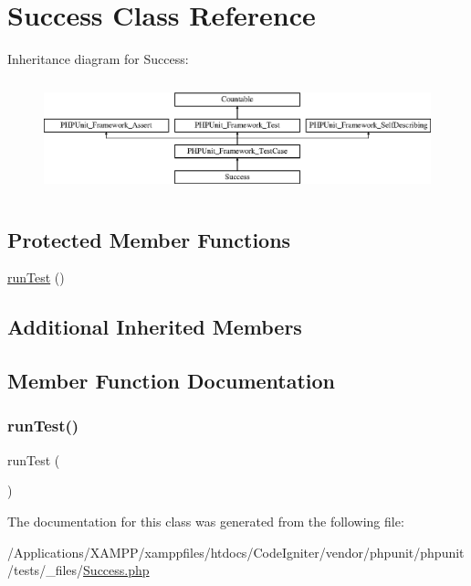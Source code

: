\hypertarget{class_success}{}\section{Success Class Reference}
\label{class_success}
Inheritance diagram for Success\+:\begin{figure}[H]
\begin{center}
\leavevmode
\includegraphics[height=3.303835cm]{class_success}
\end{center}
\end{figure}
\subsection*{Protected Member Functions}
\begin{DoxyCompactItemize}
\item 
\mbox{\hyperlink{class_success_ad2541a093be4d619db04ed65d661a684}{run\+Test}} ()
\end{DoxyCompactItemize}
\subsection*{Additional Inherited Members}


\subsection{Member Function Documentation}
\mbox{\label{class_success_ad2541a093be4d619db04ed65d661a684}} 
\subsubsection{\texorpdfstring{run\+Test()}{runTest()}}
{\footnotesize\ttfamily run\+Test (\begin{DoxyParamCaption}{ }\end{DoxyParamCaption})\hspace{0.3cm}{\ttfamily [protected]}}



The documentation for this class was generated from the following file\+:\begin{DoxyCompactItemize}
\item 
/\+Applications/\+X\+A\+M\+P\+P/xamppfiles/htdocs/\+Code\+Igniter/vendor/phpunit/phpunit/tests/\+\_\+files/\mbox{\hyperlink{_success_8php}{Success.\+php}}\end{DoxyCompactItemize}

